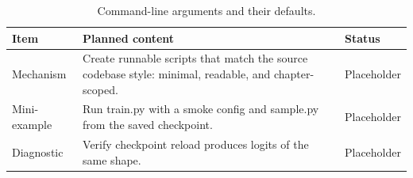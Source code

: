 \begin{table}[H]
\centering
\caption{Command-line arguments and their defaults.}
\label{tab:ch10-training-and-sampling-scripts}
\begin{tabularx}{\textwidth}{p{}X p{}}
\toprule
Item & Planned content & Status \\
\midrule
Mechanism & Create runnable scripts that match the source codebase style: minimal, readable, and chapter-scoped. & Placeholder \\
Mini-example & Run train.py with a smoke config and sample.py from the saved checkpoint. & Placeholder \\
Diagnostic & Verify checkpoint reload produces logits of the same shape. & Placeholder \\
\bottomrule
\end{tabularx}
\end{table}

